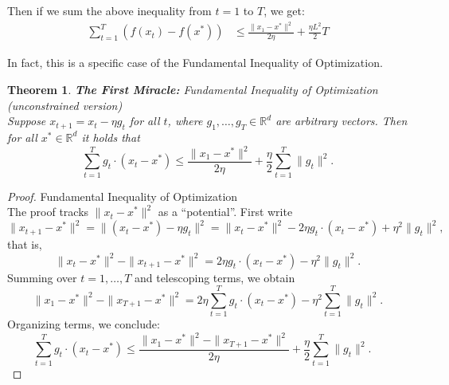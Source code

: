 \documentclass[11pt]{book} %
\newtheorem{theorem}{Theorem}[section]
\begin{document}
Then if we sum the above inequality from $t=1$ to $T$, we get:
\begin{align*}
    \sum_{t=1}^T ( f(x_t) - f(x^*) ) &\leq \frac{\|x_1 - x^*\|^2}{2 \eta} + \frac{\eta L^2}{2} T 
\end{align*}

In fact, this is a specific case of the Fundamental Inequality of Optimization. 

\begin{boxA}
    \begin{theorem}{\textbf{The First Miracle:} Fundamental Inequality of Optimization (unconstrained version)} \\
        Suppose \( x_{t+1} = x_t - \eta g_t \) for all \( t \), where \( g_1, \ldots, g_T \in \mathbb{R}^d \) are arbitrary vectors. Then for all \( x^* \in \mathbb{R}^d \) it holds that
        \[
        \sum_{t=1}^T g_t \cdot (x_t - x^*) \leq \frac{\|x_1 - x^*\|^2}{2\eta} + \frac{\eta}{2} \sum_{t=1}^T \|g_t\|^2.
        \]
    \end{theorem}
\end{boxA}
    
\begin{proof}{Fundamental Inequality of Optimization} \\
    The proof tracks \( \|x_t - x^*\|^2 \) as a ``potential''. First write
    \[
    \|x_{t+1} - x^*\|^2 = \|(x_t - x^*) - \eta g_t\|^2 = \|x_t - x^*\|^2 - 2\eta g_t \cdot (x_t - x^*) + \eta^2 \|g_t\|^2,
    \]
    that is,
    \[
    \|x_t - x^*\|^2 - \|x_{t+1} - x^*\|^2 = 2\eta g_t \cdot (x_t - x^*) - \eta^2 \|g_t\|^2.
    \]
    Summing over \( t = 1, \ldots, T \) and telescoping terms, we obtain
    \[
    \|x_1 - x^*\|^2 - \|x_{T+1} - x^*\|^2 = 2\eta \sum_{t=1}^T g_t \cdot (x_t - x^*) - \eta^2 \sum_{t=1}^T \|g_t\|^2.
    \]
    Organizing terms, we conclude:
    \[
    \sum_{t=1}^T g_t \cdot (x_t - x^*) \leq \frac{\|x_1 - x^*\|^2 - \|x_{T+1} - x^*\|^2}{2\eta} + \frac{\eta}{2} \sum_{t=1}^T \|g_t\|^2. \quad 
    \]
\end{proof}

\bigbreak


    

\end{document}
